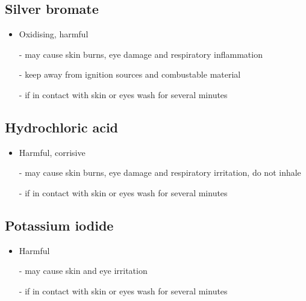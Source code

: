 \documentclass[a4paper, british]{article}
\begin{document}
\begin{appendices}
\subsection*{Silver bromate}

\begin{itemize}
    \item Oxidising, harmful
    \item[-] may cause skin burns, eye damage and respiratory inflammation 
    \item[-] keep away from ignition sources and combustable material 
    \item[-] if in contact with skin or eyes wash for several minutes  
\end{itemize}

\subsection*{Hydrochloric acid}

\begin{itemize}
    \item Harmful, corrisive
    \item[-] may cause skin burns, eye damage and respiratory irritation, do not inhale
    \item[-] if in contact with skin or eyes wash for several minutes  
\end{itemize}

\subsection*{Potassium iodide}

\begin{itemize}
    \item Harmful
    \item[-] may cause skin and eye irritation
    \item[-] if in contact with skin or eyes wash for several minutes 
\end{itemize}
    
\end{appendices}
\end{document}
